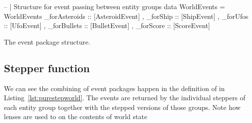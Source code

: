 \documentclass[
  digital, %
  color,   %
  table,   %
  oneside, %
  lof,     %
  lot,     %
]{fithesis3}
\begin{document}
\begin{listing}[H]
\begin{haskell}
-- | Structure for event passing between entity groups
data WorldEvents =
    WorldEvents
    { _forAsteroids :: [AsteroidEvent]
    , _forShip      :: [ShipEvent]
    , _forUfos      :: [UfoEvent]
    , _forBullets   :: [BulletEvent]
    , _forScore     :: [ScoreEvent]
    }
\end{haskell}
\caption{The event package structure.}
\label{lst:events}
\end{listing}


\subsection{Stepper function}
We can see the combining of event packages happen in the definition of 
in Listing~\ref{lst:purestepworld}. The events are returned by
the individual steppers of each entity group together with the stepped versions
of those groups. Note how lenses are used to  on the contents of world state
\end{document}
